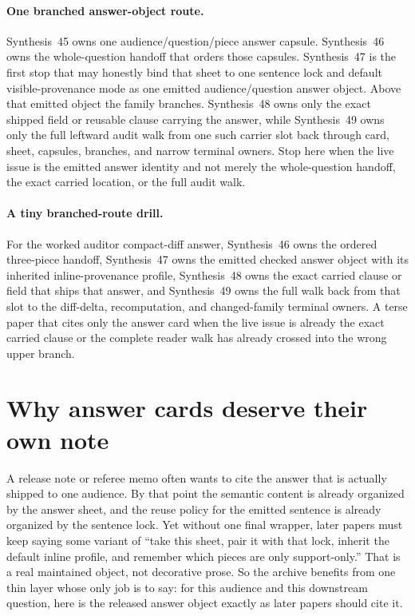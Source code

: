 \documentclass[11pt]{article}
\begin{document}
\paragraph{One branched answer-object route.}
Synthesis~45 owns one audience/question/piece answer capsule. Synthesis~46 owns the whole-question handoff that orders those capsules. Synthesis~47 is the first stop that may honestly bind that sheet to one sentence lock and default visible-provenance mode as one emitted audience/question answer object. Above that emitted object the family branches. Synthesis~48 owns only the exact shipped field or reusable clause carrying the answer, while Synthesis~49 owns only the full leftward audit walk from one such carrier slot back through card, sheet, capsules, branches, and narrow terminal owners. Stop here when the live issue is the emitted answer identity and not merely the whole-question handoff, the exact carried location, or the full audit walk.

\paragraph{A tiny branched-route drill.}
For the worked auditor compact-diff answer, Synthesis~46 owns the ordered three-piece handoff, Synthesis~47 owns the emitted checked answer object with its inherited inline-provenance profile, Synthesis~48 owns the exact carried clause or field that ships that answer, and Synthesis~49 owns the full walk back from that slot to the diff-delta, recomputation, and changed-family terminal owners. A terse paper that cites only the answer card when the live issue is already the exact carried clause or the complete reader walk has already crossed into the wrong upper branch.

\section{Why answer cards deserve their own note}
A release note or referee memo often wants to cite the answer that is actually shipped to one audience.
By that point the semantic content is already organized by the answer sheet, and the reuse policy for the emitted sentence is already organized by the sentence lock.
Yet without one final wrapper, later papers must keep saying some variant of ``take this sheet, pair it with that lock, inherit the default inline profile, and remember which pieces are only support-only.''
That is a real maintained object, not decorative prose.
So the archive benefits from one thin layer whose only job is to say: for this audience and this downstream question, here is the released answer object exactly as later papers should cite it.
\end{document}
